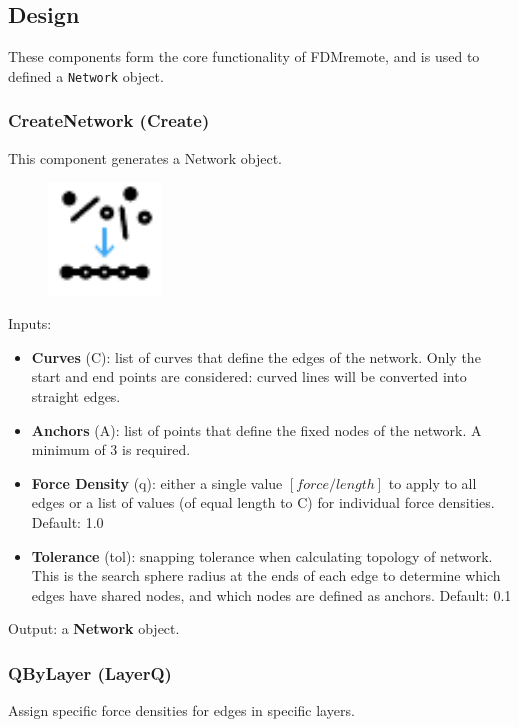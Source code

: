 \subsection{Design}\label{Design}
These components form the core functionality of FDMremote, and is used to defined a \texttt{Network} object.

\subsubsection{CreateNetwork (Create)}\label{Create}
This component generates a Network object.
\begin{figure}[h]
    \centering
    \includegraphics[width = 3cm]{Figures/Create}
\end{figure}
Inputs:
\begin{itemize}
    \setlength\itemsep{0.05em}
    \item \textbf{Curves} (C): list of curves that define the edges of the network. Only the start and end points are considered: curved lines will be converted into straight edges.
    \item \textbf{Anchors} (A): list of points that define the fixed nodes of the network. A minimum of 3 is required.
    \item \textbf{Force Density} (q): either a single value $[force/length]$ to apply to all edges or a list of values (of equal length to C) for individual force densities. {\color{gray} Default: 1.0}
    \item \textbf{Tolerance} (tol): snapping tolerance when calculating topology of network. This is the search sphere radius at the ends of each edge to determine which edges have shared nodes, and which nodes are defined as anchors. {\color{gray} Default: 0.1}
\end{itemize}

Output: a \textbf{Network} object.

\subsubsection{QByLayer (LayerQ)}\label{LayerQ}
Assign specific force densities for edges in specific layers.

